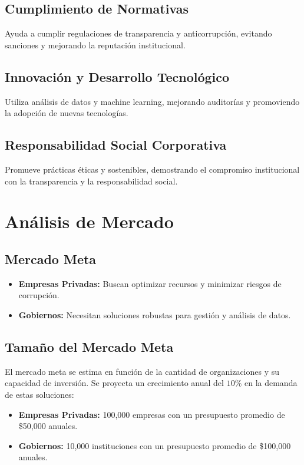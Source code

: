 \documentclass[a4paper,12pt]{article}
\begin{document}
\subsection{Cumplimiento de Normativas}
Ayuda a cumplir regulaciones de transparencia y anticorrupción, evitando sanciones y mejorando la reputación institucional.

\subsection{Innovación y Desarrollo Tecnológico}
Utiliza análisis de datos y machine learning, mejorando auditorías y promoviendo la adopción de nuevas tecnologías.

\subsection{Responsabilidad Social Corporativa}
Promueve prácticas éticas y sostenibles, demostrando el compromiso institucional con la transparencia y la responsabilidad social.


\section{Análisis de Mercado}
\subsection{Mercado Meta}
\begin{itemize}
    \item \textbf{Empresas Privadas:} Buscan optimizar recursos y minimizar riesgos de corrupción.
    \item \textbf{Gobiernos:} Necesitan soluciones robustas para gestión y análisis de datos.
\end{itemize}

\subsection{Tamaño del Mercado Meta}
El mercado meta se estima en función de la cantidad de organizaciones y su capacidad de inversión. Se proyecta un crecimiento anual del \(10\%\) en la demanda de estas soluciones:

\begin{itemize}
    \item \textbf{Empresas Privadas:} 100,000 empresas con un presupuesto promedio de \$50,000 anuales.
    \item \textbf{Gobiernos:} 10,000 instituciones con un presupuesto promedio de \$100,000 anuales.
\end{itemize}
\end{document}

